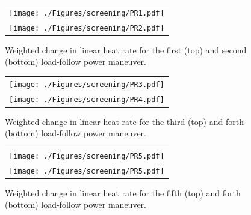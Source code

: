 \documentclass[edeposit,fullpage,11pt]{uiucthesis2009}
\begin{document}
\begin{landscape}
\begin{figure}[h]
\begin{tabular}{c}
\texttt{[image: ./Figures/screening/PR1.pdf]} \\
\texttt{[image: ./Figures/screening/PR2.pdf]} \\
\end{tabular}
\caption{Weighted change in linear heat rate for the first (top) and second (bottom) load-follow power maneuver.}
\label{fig:lf_PR1}
\end{figure}
\end{landscape}


\begin{landscape}
\begin{figure}[h]
\begin{tabular}{c}
\texttt{[image: ./Figures/screening/PR3.pdf]} \\
\texttt{[image: ./Figures/screening/PR4.pdf]} \\
\end{tabular}
\caption{Weighted change in linear heat rate for the third (top) and forth (bottom) load-follow power maneuver.}
\label{fig:lf_PR2}
\end{figure}
\end{landscape}


\begin{landscape}
\begin{figure}[h]
\begin{tabular}{c}
\texttt{[image: ./Figures/screening/PR5.pdf]} \\
\texttt{[image: ./Figures/screening/PR5.pdf]} \\
\end{tabular}
\caption{Weighted change in linear heat rate for the fifth (top) and forth (bottom) load-follow power maneuver.}
\label{fig:lf_PR3}
\end{figure}
\end{landscape}
\end{document}
